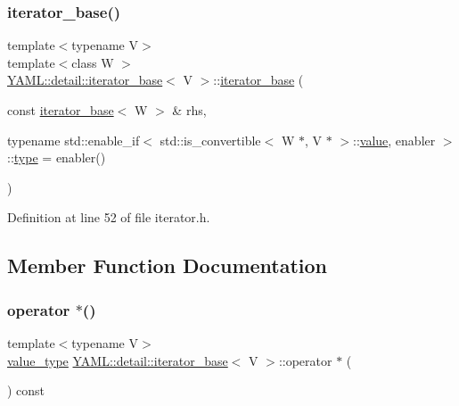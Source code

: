 \subsubsection{\texorpdfstring{iterator\_base()}{iterator\_base()}\hspace{0.1cm}{\footnotesize\ttfamily [3/3]}}
{\footnotesize\ttfamily template$<$typename V$>$ \\
template$<$class W $>$ \\
\mbox{\hyperlink{class_y_a_m_l_1_1detail_1_1iterator__base}{Y\+A\+M\+L\+::detail\+::iterator\+\_\+base}}$<$ V $>$\+::\mbox{\hyperlink{class_y_a_m_l_1_1detail_1_1iterator__base}{iterator\+\_\+base}} (\begin{DoxyParamCaption}\item[{const \mbox{\hyperlink{class_y_a_m_l_1_1detail_1_1iterator__base}{iterator\+\_\+base}}$<$ W $>$ \&}]{rhs,  }\item[{typename std\+::enable\+\_\+if$<$ std\+::is\+\_\+convertible$<$ W $\ast$, V $\ast$ $>$\+::\mbox{\hyperlink{glad_8h_a03aff08f73d7fde3d1a08e0abd8e84fa}{value}}, enabler $>$\+::\mbox{\hyperlink{glad_8h_a890efa53b3d7deeeced6f3a0d6653ed3}{type}}}]{ = {\ttfamily enabler()} }\end{DoxyParamCaption})\hspace{0.3cm}{\ttfamily [inline]}}



Definition at line 52 of file iterator.\+h.



\subsection{Member Function Documentation}
\mbox{\label{class_y_a_m_l_1_1detail_1_1iterator__base_a346a4655f4467cc87d9ae57478344032}} 
\subsubsection{\texorpdfstring{operator $\ast$()}{operator *()}}
{\footnotesize\ttfamily template$<$typename V$>$ \\
\mbox{\hyperlink{class_y_a_m_l_1_1detail_1_1iterator__base_a21987ede08ffbfacc0e3caa39e66cb00}{value\+\_\+type}} \mbox{\hyperlink{class_y_a_m_l_1_1detail_1_1iterator__base}{Y\+A\+M\+L\+::detail\+::iterator\+\_\+base}}$<$ V $>$\+::operator $\ast$ (\begin{DoxyParamCaption}{ }\end{DoxyParamCaption}) const\hspace{0.3cm}{\ttfamily [inline]}}



